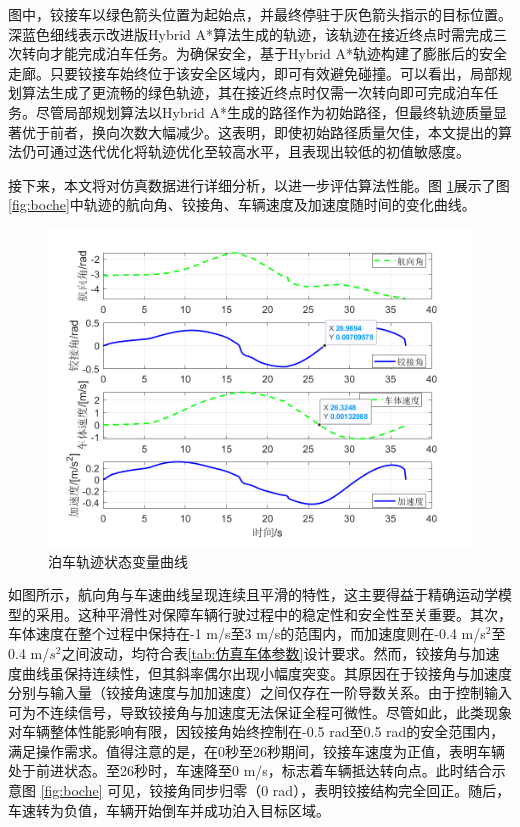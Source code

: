 \documentclass[master,academic]{ysuthesis} %
\begin{document}
		图中，铰接车以绿色箭头位置为起始点，并最终停驻于灰色箭头指示的目标位置。深蓝色细线表示改进版Hybrid A*算法生成的轨迹，该轨迹在接近终点时需完成三次转向才能完成泊车任务。为确保安全，基于Hybrid A*轨迹构建了膨胀后的安全走廊。只要铰接车始终位于该安全区域内，即可有效避免碰撞。可以看出，局部规划算法生成了更流畅的绿色轨迹，其在接近终点时仅需一次转向即可完成泊车任务。尽管局部规划算法以Hybrid A*生成的路径作为初始路径，但最终轨迹质量显著优于前者，换向次数大幅减少。这表明，即使初始路径质量欠佳，本文提出的算法仍可通过迭代优化将轨迹优化至较高水平，且表现出较低的初值敏感度。


		接下来，本文将对仿真数据进行详细分析，以进一步评估算法性能。图 \ref{fig:databochestate}展示了图\ref{fig:boche}中轨迹的航向角、铰接角、车辆速度及加速度随时间的变化曲线。
		\begin{figure}[H]
			\centering
			\includegraphics[width=1\textwidth]{databochestate.png}
			\caption{泊车轨迹状态变量曲线}
			\label{fig:databochestate}
		\end{figure}

		如图所示，航向角与车速曲线呈现连续且平滑的特性，这主要得益于精确运动学模型的采用。这种平滑性对保障车辆行驶过程中的稳定性和安全性至关重要。其次，车体速度在整个过程中保持在-1 m/s至3 m/s的范围内，而加速度则在-0.4 m/s$^\text{2}$至0.4 m/$s^\text{2}$之间波动，均符合表\ref{tab:仿真车体参数}设计要求。然而，铰接角与加速度曲线虽保持连续性，但其斜率偶尔出现小幅度突变。其原因在于铰接角与加速度分别与输入量（铰接角速度与加加速度）之间仅存在一阶导数关系。由于控制输入可为不连续信号，导致铰接角与加速度无法保证全程可微性。尽管如此，此类现象对车辆整体性能影响有限，因铰接角始终控制在-0.5 rad至0.5 rad的安全范围内，满足操作需求。值得注意的是，在0秒至26秒期间，铰接车速度为正值，表明车辆处于前进状态。至26秒时，车速降至0 m/s，标志着车辆抵达转向点。此时结合示意图 \ref{fig:boche} 可见，铰接角同步归零（0 rad），表明铰接结构完全回正。随后，车速转为负值，车辆开始倒车并成功泊入目标区域。
		
\end{document}
